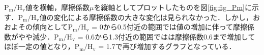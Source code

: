 $\mathrm{P_m/H_v}$値を横軸，摩擦係数$\mu$を縦軸としてプロットしたものを図\ref{fig:fig_Pm}に示す．$\mathrm{P_m/H_v}$値の変化による摩擦係数の大きな変化は見られなかった．しかし，おおよその傾向として$\mathrm{P_m/H_v}$ = 0から0.5付近の範囲では値の増加に伴って摩擦係数がやや減少．$\mathrm{P_m/H_v}$ = 0.6から1.3付近の範囲ではは摩擦係数0.6まで増加してほぼ一定の値となり，$\mathrm{P_m/H_v}$ = 1.7で再び増加するグラフとなっている．

\begin{table}[htbp]
    \centering
    \caption{Theoretical contact area, average contact pressure, $\mathrm{P_m/H_v}$ value and static contact morphology(R=1[mm]).}
    \label{tbl:平均圧力1mm}
\end{table}

\begin{table}[htbp]
    \centering
    \caption{Theoretical contact area, average contact pressure, $\mathrm{P_m/H_v}$ value and static contact morphology(R=4[mm]).}
    \label{tbl:平均圧力4mm}
\end{table}

